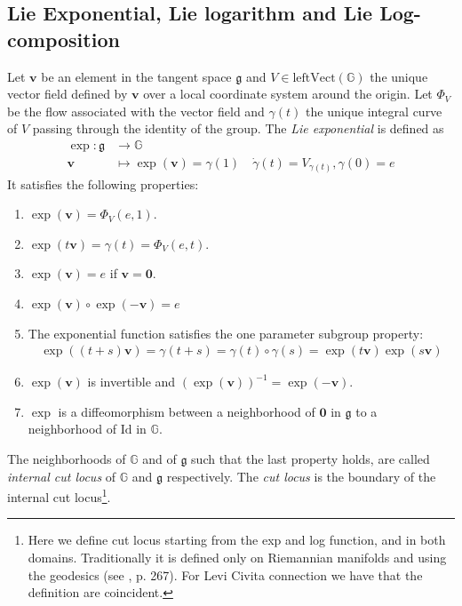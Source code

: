 \subsection{Lie Exponential, Lie logarithm and Lie Log-composition}\label{se:lie_exp_log_comp}
Let $\mathbf{v}$ be an element in the tangent space $\mathfrak{g}$ and $V\in\text{left}\text{Vect}(\mathbb{G})$ the unique vector field defined by $\mathbf{v}$ over a local coordinate system around the origin. Let $\Phi_{V}$ be the flow associated with the vector field and $\gamma(t)$ the unique integral curve of $V$ passing through the identity of the group.  
The \emph{Lie exponential} is defined as
\begin{align*}
\exp :  \mathfrak{g} & \longrightarrow  \mathbb{G}  \\
\mathbf{v} &\longmapsto  \exp(\mathbf{v} ) = \gamma(1) \quad \dot{\gamma}(t) = V_{\gamma(t)}, \gamma(0) = e
\end{align*}
It satisfies the following properties:
\begin{enumerate}
	\item $\exp(\mathbf{v}) = \Phi_{V}(e,1)$.
	\item $\exp(t\mathbf{v}) =\gamma(t) = \Phi_{V}(e,t)$.
	\item $\exp(\mathbf{v}) = e$ if $\mathbf{v} = \mathbf{0}$.
	\item $\exp(\mathbf{v})\circ \exp(\mathbf{-v})  = e$
	\item The exponential function satisfies the one parameter subgroup property:
	\begin{align*}
	\exp((t+s)\mathbf{v}) = \gamma(t+s) = \gamma(t)\circ \gamma(s) = \exp(t\mathbf{v})\exp(s\mathbf{v})
	\end{align*}
	\item $\exp(\mathbf{v})$ is invertible and $(\exp(\mathbf{v}))^{-1} = \exp(-\mathbf{v})$.
	\item $\exp$ is a diffeomorphism between a neighborhood of $\mathbf{0}$ in $\mathfrak{g}$ to a neighborhood of $\text{Id}$ in $\mathbb{G}$.
\end{enumerate}
The neighborhoods of $\mathbb{G}$ and of $\mathfrak{g}$ such that the last property holds, are called \emph{internal cut locus} of $\mathbb{G}$ and $\mathfrak{g}$ respectively. The \emph{cut locus} is the boundary of the internal cut locus\footnote{Here we define cut locus starting from the exp and log function, and in both domains. Traditionally it is defined only on Riemannian manifolds and using the geodesics (see \cite{do1992riemannian}, p. 267). For Levi Civita connection we have that the definition are coincident.}.\\
